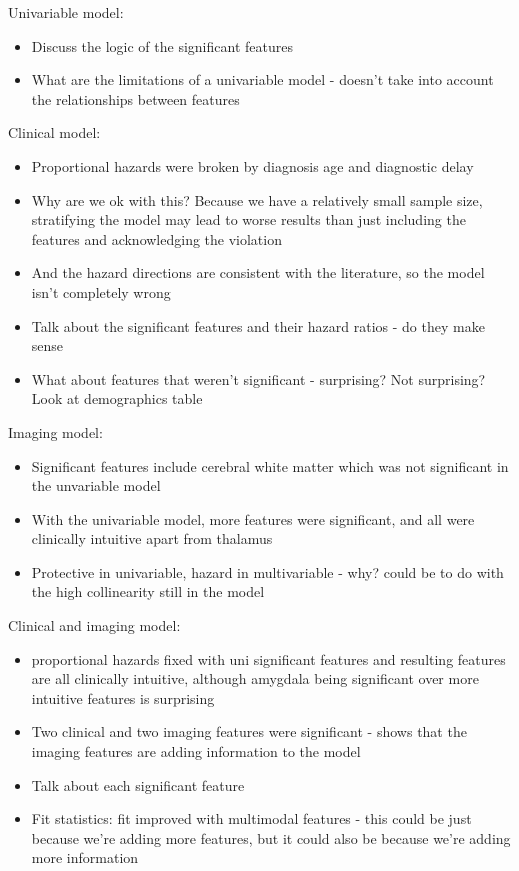 Univariable model:
\begin{itemize}
    \item Discuss the logic of the significant features
    \item What are the limitations of a univariable model - doesn't take into account the relationships between features
\end{itemize}

Clinical model:
\begin{itemize}
    \item Proportional hazards were broken by diagnosis age and diagnostic delay
    \item Why are we ok with this? Because we have a relatively small sample size, stratifying the model may lead to worse results than just including the features and acknowledging the violation
    \item And the hazard directions are consistent with the literature, so the model isn't completely wrong
    \item Talk about the significant features and their hazard ratios - do they make sense
    \item What about features that weren't significant - surprising? Not surprising? Look at demographics table
\end{itemize}

Imaging model:
\begin{itemize}
    \item Significant features include cerebral white matter which was not significant in the unvariable model
    \item With the univariable model, more features were significant, and all were clinically intuitive apart from thalamus
    \item Protective in univariable, hazard in multivariable - why? could be to do with the high collinearity still in the model
\end{itemize}

Clinical and imaging model:
\begin{itemize}
    \item proportional hazards fixed with uni significant features and resulting features are all clinically intuitive, although amygdala being significant over more intuitive features is surprising
    \item Two clinical and two imaging features were significant - shows that the imaging features are adding information to the model
    \item Talk about each significant feature
    \item Fit statistics: fit improved with multimodal features - this could be just because we're adding more features, but it could also be because we're adding more information
\end{itemize}

